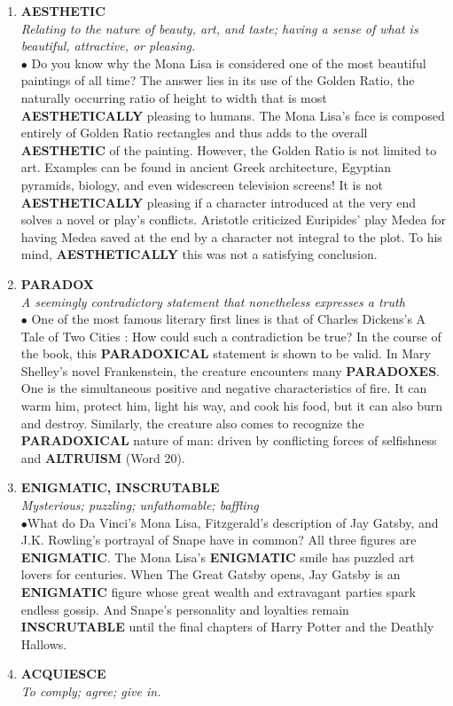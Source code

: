 \documentclass{book}
\begin{document}
\begin{enumerate}
\item \textbf{AESTHETIC}\\
\textit{Relating to the nature of beauty, art, and taste; having a sense of what is beautiful, attractive, or pleasing.}\\

$\bullet$ Do you know why the Mona Lisa is considered one of the most beautiful paintings of all time? The answer lies in its use of the Golden Ratio, the naturally occurring ratio of height to width that is most \textbf{AESTHETICALLY} pleasing to humans. The Mona Lisa's face is composed entirely of Golden Ratio rectangles and thus adds to the overall \textbf{AESTHETIC} of the painting. However, the Golden Ratio is not limited to art. Examples can be found in ancient Greek architecture, Egyptian pyramids, biology, and even widescreen television screens! It is not \textbf{AESTHETICALLY} pleasing if a character introduced at the very end solves a novel or play's conflicts. Aristotle criticized Euripides' play Medea for having Medea saved at the end by a character not integral to the plot. To his mind, \textbf{AESTHETICALLY} this was not a satisfying conclusion.

\item \textbf{PARADOX}\\ 
\textit{A seemingly contradictory statement that nonetheless expresses a truth}\\

$\bullet$ One of the most famous literary first lines is that of Charles Dickens's A Tale of Two Cities :  How could such a contradiction be true? In the course of the book, this \textbf{PARADOXICAL} statement is shown to be valid. In Mary Shelley's novel Frankenstein, the creature encounters many \textbf{PARADOXES}. One is the simultaneous positive and negative characteristics of fire. It can warm him, protect him, light his way, and cook his food, but it can also burn and destroy. Similarly, the creature also comes to recognize the \textbf{PARADOXICAL} nature of man: driven by conflicting forces of selfishness and \textbf{ALTRUISM} (Word 20).
\item \textbf{ENIGMATIC, INSCRUTABLE}\\ \textit{Mysterious; puzzling; unfathomable; baffling}\\ 

$\bullet$What do Da Vinci's Mona Lisa, Fitzgerald's description of Jay Gatsby, and J.K. Rowling's portrayal of Snape have in common? All three figures are \textbf{ENIGMATIC}. The Mona Lisa's \textbf{ENIGMATIC} smile has puzzled art lovers for centuries. When The Great Gatsby opens, Jay Gatsby is an \textbf{ENIGMATIC} figure whose great wealth and extravagant parties spark endless gossip. And Snape's personality and loyalties remain \textbf{INSCRUTABLE} until the final chapters of Harry Potter and the Deathly Hallows. 
\item \textbf{ACQUIESCE}\\ \textit{To comply; agree; give in.}\\ 


\end{enumerate}
\end{document}
